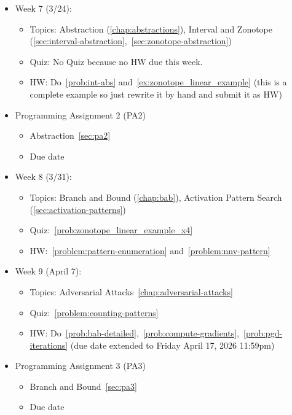 \documentclass[oneside,11pt,dvipsnames]{book}
\numberwithin{equation}{section}
\theoremstyle{definition}
\theoremstyle{remark}
\newcommand{\alert}[1]{{\color{red}{#1}}}
\begin{document}
\begin{itemize}
    \item Week 7 (3/24):
    \begin{itemize}
        \item Topics: Abstraction (\autoref{chap:abstractions}), Interval and Zonotope (\autoref{sec:interval-abstraction},~\autoref{sec:zonotope-abstraction})
        \item Quiz: No Quiz because no HW due this week.
        \item HW: Do~\autoref{prob:int-abs} and~\autoref{ex:zonotope_linear_example} (this is a complete example so just rewrite it by hand and submit it as HW)      
    \end{itemize}

    \item Programming Assignment 2 (PA2)
    \begin{itemize}
        \item Abstraction~\autoref{sec:pa2}
        \item Due date \alert{Monday April 13, 2026 11:59 PM}
    \end{itemize}
    
    \item Week 8 (3/31):
    \begin{itemize}
        \item Topics: Branch and Bound (\autoref{chap:bab}), Activation Pattern Search (\autoref{sec:activation-patterns})
        \item Quiz:~\autoref{prob:zonotope_linear_example_x4}
        \item HW:~\autoref{problem:pattern-enumeration} and~\autoref{problem:nnv-pattern}

    \end{itemize}

    \item Week 9 (April 7):
    \begin{itemize}
        \item Topics: Adversarial Attacks~\autoref{chap:adversarial-attacks} %
        \item Quiz:~\autoref{problem:counting-patterns}
        \item HW: Do~\autoref{prob:bab-detailed},~\autoref{prob:compute-gradients},~\autoref{prob:pgd-iterations} (due date extended to Friday April 17, 2026 11:59pm)

    \end{itemize}
    \item Programming Assignment 3 (PA3)
    \begin{itemize}
        \item Branch and Bound~\autoref{sec:pa3}
        \item Due date \alert{Friday May 1, 2026 11:59pm}
    \end{itemize}



\end{itemize}
\end{document}
